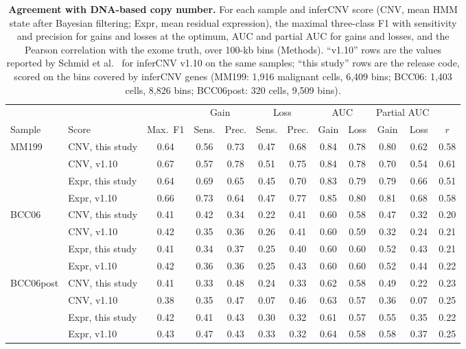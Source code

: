 \begin{table}[p]
\centering
\footnotesize
\caption{\textbf{Agreement with DNA-based copy number.} For each sample and inferCNV score (CNV, mean HMM state after Bayesian filtering; Expr, mean residual expression), the maximal three-class F1 with sensitivity and precision for gains and losses at the optimum, AUC and partial AUC for gains and losses, and the Pearson correlation with the exome truth, over 100-kb bins (Methods). ``v1.10'' rows are the values reported by Schmid et al.~\citep{schmid2025} for inferCNV v1.10 on the same samples; ``this study'' rows are the release code, scored on the bins covered by inferCNV genes (MM199: 1,916 malignant cells, 6,409 bins; BCC06: 1,403 cells, 8,826 bins; BCC06post: 320 cells, 9,509 bins).}
\label{tab:S2}
\setlength{\tabcolsep}{4pt}
\begin{tabular}{@{}llcccccccccc@{}}
\toprule
 & & & \multicolumn{2}{c}{Gain} & \multicolumn{2}{c}{Loss} & \multicolumn{2}{c}{AUC} & \multicolumn{2}{c}{Partial AUC} & \\
\cmidrule(lr){4-5}\cmidrule(lr){6-7}\cmidrule(lr){8-9}\cmidrule(lr){10-11}
Sample & Score & Max.\ F1 & Sens. & Prec. & Sens. & Prec. & Gain & Loss & Gain & Loss & $r$ \\
\midrule
MM199     & CNV, this study  & 0.64 & 0.56 & 0.73 & 0.47 & 0.68 & 0.84 & 0.78 & 0.80 & 0.62 & 0.58 \\
          & CNV, v1.10       & 0.67 & 0.57 & 0.78 & 0.51 & 0.75 & 0.84 & 0.78 & 0.70 & 0.54 & 0.61 \\
          & Expr, this study & 0.64 & 0.69 & 0.65 & 0.45 & 0.70 & 0.83 & 0.79 & 0.79 & 0.66 & 0.51 \\
          & Expr, v1.10      & 0.66 & 0.73 & 0.64 & 0.47 & 0.77 & 0.85 & 0.80 & 0.81 & 0.68 & 0.58 \\
\addlinespace
BCC06     & CNV, this study  & 0.41 & 0.42 & 0.34 & 0.22 & 0.41 & 0.60 & 0.58 & 0.47 & 0.32 & 0.20 \\
          & CNV, v1.10       & 0.42 & 0.35 & 0.36 & 0.26 & 0.41 & 0.60 & 0.59 & 0.32 & 0.24 & 0.21 \\
          & Expr, this study & 0.41 & 0.34 & 0.37 & 0.25 & 0.40 & 0.60 & 0.60 & 0.52 & 0.43 & 0.21 \\
          & Expr, v1.10      & 0.42 & 0.36 & 0.36 & 0.25 & 0.43 & 0.60 & 0.60 & 0.52 & 0.44 & 0.22 \\
\addlinespace
BCC06post & CNV, this study  & 0.41 & 0.33 & 0.48 & 0.24 & 0.33 & 0.62 & 0.58 & 0.49 & 0.22 & 0.23 \\
          & CNV, v1.10       & 0.38 & 0.35 & 0.47 & 0.07 & 0.46 & 0.63 & 0.57 & 0.36 & 0.07 & 0.25 \\
          & Expr, this study & 0.42 & 0.41 & 0.43 & 0.30 & 0.32 & 0.61 & 0.57 & 0.55 & 0.35 & 0.22 \\
          & Expr, v1.10      & 0.43 & 0.47 & 0.43 & 0.33 & 0.32 & 0.64 & 0.58 & 0.58 & 0.37 & 0.25 \\
\bottomrule
\end{tabular}
\end{table}

